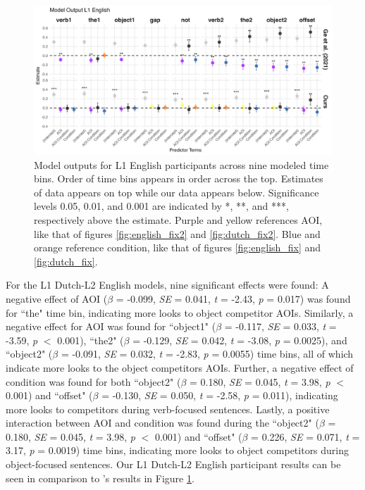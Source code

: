 \begin{figure}[H]  %
    \centering
    \includegraphics[width=\textwidth,height=\textheight,keepaspectratio]{viz/model_plot_english.png}
    \caption{Model outputs for L1 English participants across nine modeled time bins. Order of time bins appears in order across the top. Estimates of \cite{Ge2021} data appears on top while our data appears below. Significance levels 0.05, 0.01, and 0.001 are indicated by *, **, and ***, respectively above the estimate. Purple and yellow references AOI, like that of figures \ref{fig:english_fix2} and \ref{fig:dutch_fix2}. Blue and orange reference condition, like that of figures \ref{fig:english_fix} and \ref{fig:dutch_fix}.}
    \label{fig:model_plot_english}
\end{figure}

For the L1 Dutch-L2 English models, nine significant effects were found: A negative effect of AOI ($\beta$ = -0.099, \textit{SE} = 0.041, \textit{t} = -2.43, \textit{p} = 0.017) was found for ``the" time bin, indicating more looks to object competitor AOIs. Similarly, a negative effect for AOI was found for ``object1" ($\beta$ = -0.117, \textit{SE} = 0.033, \textit{t} = -3.59, \textit{p} $<$ 0.001), ``the2" ($\beta$ = -0.129, \textit{SE} = 0.042, \textit{t} = -3.08, \textit{p} = 0.0025), and ``object2" ($\beta$ = -0.091, \textit{SE} = 0.032, \textit{t} = -2.83, \textit{p} = 0.0055) time bins, all of which indicate more looks to the object competitors AOIs. Further, a negative effect of condition was found for both ``object2" ($\beta$ = 0.180, \textit{SE} = 0.045, \textit{t} = 3.98, \textit{p} $<$ 0.001) and ``offset" ($\beta$ = -0.130, \textit{SE} = 0.050, \textit{t} = -2.58, \textit{p} = 0.011), indicating more looks to competitors during verb-focused sentences. Lastly, a positive interaction between AOI and condition was found during the ``object2" ($\beta$ = 0.180, \textit{SE} = 0.045, \textit{t} = 3.98, \textit{p} $<$ 0.001) and ``offset" ($\beta$ = 0.226, \textit{SE} = 0.071, \textit{t} = 3.17, \textit{p} = 0.0019) time bins, indicating more looks to object competitors during object-focused sentences. Our L1 Dutch-L2 English participant results can be seen in comparison to \cite{Ge2021}'s results in Figure \ref{fig:model_plot_english}.


